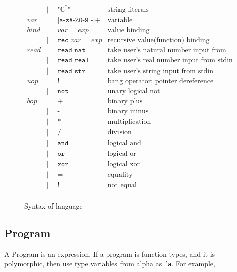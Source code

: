 \documentclass[12pt, a4paper, oneside]{book}
\begin{document}
\begin{figure}[h]
\begin{math}
\begin{array}{lcll}
              & | & \texttt{"}\mathbb{C}^{*} \texttt{"} & \text{string literals} \\
      var & = & \texttt{[a-zA-Z0-9\_-]+} & \text{variable} \\
      bind & = & var \texttt{ = } exp & \text{value binding} \\
              & | & \texttt{rec } var \texttt{ = } exp & \text{recursive value(function) binding} \\
      read & = & \texttt{read\_nat} & \text{take user's natural number input from stdin} \\
              & | & \texttt{read\_real} & \text{take user's real number input from stdin} \\
              & | & \texttt{read\_str} & \text{take user's string input from stdin} \\
      uop & = & \texttt{!} & \text{bang operator; pointer dereference} \\
              & | & \texttt{not} & \text{unary logical not} \\
      bop & = & \texttt{+} & \text{binary plus} \\
              & | & \texttt{-} & \text{binary minus} \\
              & | & \texttt{*} & \text{multiplication} \\
              & | & \texttt{/} & \text{division} \\
              & | & \texttt{and} & \text{logical and} \\
              & | & \texttt{or} & \text{logical or} \\
              & | & \texttt{xor} & \text{logical xor} \\
              & | & \texttt{=} & \text{equality} \\
              & | & \texttt{!=} & \text{not equal} \\
    \end{array}
  \end{math}

  \caption{Syntax of language}
  \label{fig:syntax}
\end{figure}


\subsection{Program}
\label{sec:program}

A Program is an expression. If a program is function types, and it is
polymorphic, then use type variables from alpha as \texttt{'a}. For
example,
\end{document}

